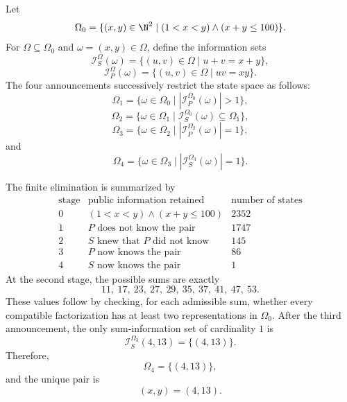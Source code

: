     \begin{solution}
        Let
        \[
            \Omega_0
            =
            \{(x,y)\in\N^2\mid (1<x<y)\land(x+y\leq100)\}.
        \]
        For $\Omega\subseteq\Omega_0$ and $\omega=(x,y)\in\Omega$, define the
        information sets
        \[
            \mathcal{I}_S^\Omega(\omega)
            =
            \{(u,v)\in\Omega\mid u+v=x+y\},
        \]
        \[
            \mathcal{I}_P^\Omega(\omega)
            =
            \{(u,v)\in\Omega\mid uv=xy\}.
        \]
        The four announcements successively restrict the state space as follows:
        \[
            \Omega_1
            =
            \{\omega\in\Omega_0\mid
              |\mathcal{I}_P^{\Omega_0}(\omega)|>1\},
        \]
        \[
            \Omega_2
            =
            \{\omega\in\Omega_1\mid
              \mathcal{I}_S^{\Omega_0}(\omega)\subseteq\Omega_1\},
        \]
        \[
            \Omega_3
            =
            \{\omega\in\Omega_2\mid
              |\mathcal{I}_P^{\Omega_2}(\omega)|=1\},
        \]
        and
        \[
            \Omega_4
            =
            \{\omega\in\Omega_3\mid
              |\mathcal{I}_S^{\Omega_3}(\omega)|=1\}.
        \]

        The finite elimination is summarized by
        \[
            \begin{array}{c|l|c}
                \text{stage} & \text{public information retained} &
                \text{number of states}\\
                \hline
                0 & (1<x<y)\land(x+y\leq100) & 2352\\
                1 & P\text{ does not know the pair} & 1747\\
                2 & S\text{ knew that }P\text{ did not know} & 145\\
                3 & P\text{ now knows the pair} & 86\\
                4 & S\text{ now knows the pair} & 1
            \end{array}
        \]
        At the second stage, the possible sums are exactly
        \[
            11,\ 17,\ 23,\ 27,\ 29,\ 35,\ 37,\ 41,\ 47,\ 53.
        \]
        These values follow by checking, for each admissible sum, whether every
        compatible factorization has at least two representations in
        $\Omega_0$. After the third announcement, the only sum-information set
        of cardinality $1$ is
        \[
            \mathcal{I}_S^{\Omega_3}(4,13)=\{(4,13)\}.
        \]
        Therefore,
        \[
            \Omega_4=\{(4,13)\},
        \]
        and the unique pair is
        \[
            \boxed{(x,y)=(4,13)}.
        \]
    \end{solution}

